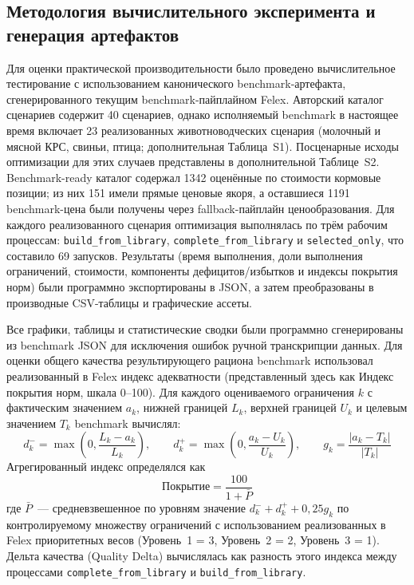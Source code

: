 \documentclass[a4paper,fleqn]{cas-sc}
\begin{document}
\subsection{Методология вычислительного эксперимента и генерация артефактов}\label{subsec:experiment}

Для оценки практической производительности было проведено вычислительное тестирование с использованием канонического benchmark-артефакта, сгенерированного текущим benchmark-пайплайном Felex. Авторский каталог сценариев содержит 40 сценариев, однако исполняемый benchmark в настоящее время включает 23 реализованных животноводческих сценария (молочный и мясной КРС, свиньи, птица; дополнительная Таблица~S1). Посценарные исходы оптимизации для этих случаев представлены в дополнительной Таблице~S2. Benchmark-ready каталог содержал 1342 оценённые по стоимости кормовые позиции; из них 151 имели прямые ценовые якоря, а оставшиеся 1191 benchmark-цена были получены через fallback-пайплайн ценообразования. Для каждого реализованного сценария оптимизация выполнялась по трём рабочим процессам: \texttt{build\_from\_library}, \texttt{complete\_from\_library} и \texttt{selected\_only}, что составило 69 запусков. Результаты (время выполнения, доли выполнения ограничений, стоимости, компоненты дефицитов/избытков и индексы покрытия норм) были программно экспортированы в JSON, а затем преобразованы в производные CSV-таблицы и графические ассеты.

Все графики, таблицы и статистические сводки были программно сгенерированы из benchmark JSON для исключения ошибок ручной транскрипции данных. Для оценки общего качества результирующего рациона benchmark использовал реализованный в Felex индекс адекватности (представленный здесь как Индекс покрытия норм, шкала 0--100). Для каждого оцениваемого ограничения $k$ с фактическим значением $a_k$, нижней границей $L_k$, верхней границей $U_k$ и целевым значением $T_k$ benchmark вычислял:
\begin{equation}
 d^-_k = \max\left(0, \frac{L_k - a_k}{L_k}\right), \qquad
 d^+_k = \max\left(0, \frac{a_k - U_k}{U_k}\right), \qquad
 g_k = \frac{|a_k - T_k|}{|T_k|}
\end{equation}
Агрегированный индекс определялся как
\begin{equation}
\text{Покрытие} = \frac{100}{1 + \bar{P}}
\end{equation}
где $\bar{P}$~--- средневзвешенное по уровням значение $d^-_k + d^+_k + 0{,}25 g_k$ по контролируемому множеству ограничений с использованием реализованных в Felex приоритетных весов (Уровень~1 = 3, Уровень~2 = 2, Уровень~3 = 1). Дельта качества (Quality Delta) вычислялась как разность этого индекса между процессами \texttt{complete\_from\_library} и \texttt{build\_from\_library}.
\end{document}
